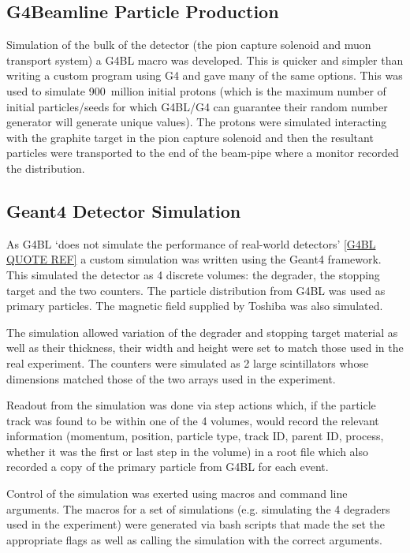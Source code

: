 \documentclass[]{article}
\begin{document}
\subsection{G4Beamline Particle Production} %
\label{sub:g4bl_particle_production}
Simulation of the bulk of the detector (the pion capture solenoid and muon transport system) a G4BL macro was developed. This is quicker and simpler than writing a custom program using G4 and gave many of the same options. This was used to simulate 900~million initial protons (which is the maximum number of initial particles/seeds for which G4BL/G4 can guarantee their random number generator will generate unique values). The protons were simulated interacting with the graphite target in the pion capture solenoid and then the resultant particles were transported to the end of the beam-pipe where a monitor recorded the distribution.

\subsection{Geant4 Detector Simulation} %
\label{sub:geant4_detector_simulation}
As G4BL `does not simulate the performance of real-world detectors' \ref{G4BL QUOTE REF} a custom simulation was written using the Geant4 framework. This simulated the detector as 4 discrete volumes: the degrader, the stopping target and the two counters. The particle distribution from G4BL was used as primary particles. The magnetic field supplied by Toshiba was also simulated.

The simulation allowed variation of the degrader and stopping target material as well as their thickness, their width and height were set to match those used in the real experiment. The counters were simulated as 2 large scintillators whose dimensions matched those of the two arrays used in the experiment.

Readout from the simulation was done via step actions which, if the particle track was found to be within one of the 4 volumes, would record the relevant information (momentum, position, particle type, track ID, parent ID, process, whether it was the first or last step in the volume) in a root file which also recorded a copy of the primary particle from G4BL for each event.

Control of the simulation was exerted using macros and command line arguments. The macros for a set of simulations (e.g. simulating the 4 degraders used in the experiment) were generated via bash scripts that made the set the appropriate flags as well as calling the simulation with the correct arguments.
\end{document}
